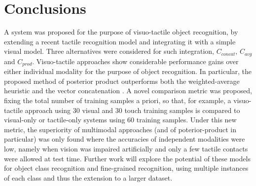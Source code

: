\documentclass[9pt,technote]{IEEEtran}  %
\begin{document}
\section{Conclusions}
A system was proposed for the purpose of visuo-tactile object recognition, by extending a recent tactile recognition model \cite{Corradi2015} and integrating it with a simple visual model. Three alternatives were considered for such integration, $C_{concat}$, $C_{avg}$ and $C_{prod}$. Visuo-tactile approaches show considerable performance gains over either individual modality for the purpose of object recognition. In particular, the proposed method of posterior product outperforms both the weighted-average heuristic and the vector concatenation \cite{Yang2015}. A novel comparison metric was proposed, fixing the total number of training samples a priori, so that, for example, a visuo-tactile approach using 30 visual and 30 touch training samples is compared to visual-only or tactile-only systems using 60 training samples. Under this new metric, the superiority of multimodal approaches (and of poterior-product in particular) was only found where the accuracies of independent modalities were low, namely when vision was impaired artificially and only a few tactile contacts were allowed at test time. Further work will explore the potential of these models for object class recognition and fine-grained recognition, using multiple instances of each class and thus the extension to a larger dataset.
	



	
\end{document}
